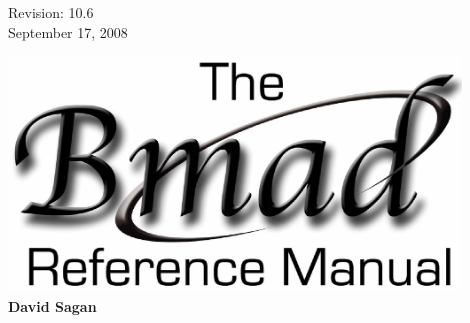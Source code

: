 \thispagestyle{empty}

\begin{flushright}
\large
  Revision: 10.6 \\
  September 17, 2008 \\
\end{flushright}

\vfill

{
\begin{center}
\includegraphics[width=12cm]{bmad-ref-manual.eps} \\
\vskip 0.3in
\huge\bf David Sagan
\end{center}
}

\vfill
\break

